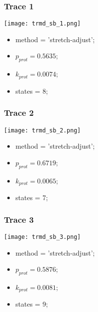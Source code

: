 \subsubsection{Trace 1}
\begin{minipage}[c]{0.7\textwidth}
    \texttt{[image: trmd\_sb\_1.png]}
\end{minipage}
\hfill
\begin{minipage}[c]{0.45\textwidth}
    \begin{itemize}
        \item method = 'stretch-adjust';
        \item $p_{prot}=0.5635$;
        \item $k_{prot}=0.0074$;
        \item states = 8;
    \end{itemize}
\end{minipage}

\subsubsection{Trace 2}
\begin{minipage}[c]{0.7\textwidth}
    \texttt{[image: trmd\_sb\_2.png]}
\end{minipage}
\hfill
\begin{minipage}[c]{0.45\textwidth}
    \begin{itemize}
        \item method = 'stretch-adjust';
        \item $p_{prot}=0.6719$;
        \item $k_{prot}=0.0065$;
        \item states = 7;
    \end{itemize}
\end{minipage}

\subsubsection{Trace 3}
\begin{minipage}[c]{0.7\textwidth}
    \texttt{[image: trmd\_sb\_3.png]}
\end{minipage}
\hfill
\begin{minipage}[c]{0.45\textwidth}
    \begin{itemize}
        \item method = 'stretch-adjust';
        \item $p_{prot}=0.5876$;
        \item $k_{prot}=0.0081$;
        \item states = 9;
    \end{itemize}
\end{minipage}

